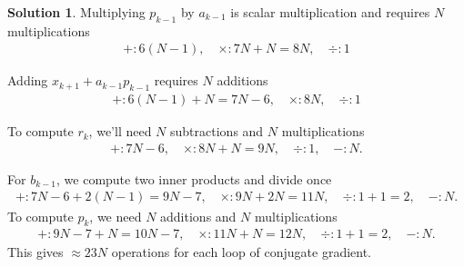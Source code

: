 \documentclass[12pt]{article}
\theoremstyle{definition}
\newtheorem{sol}{Solution}
\theoremstyle{remark}
\begin{document}
\begin{sol}
Multiplying $p_{k-1}$ by $a_{k-1}$ is scalar multiplication and requires $N$ multiplications 
\begin{align*}
    +: 6(N-1), \quad  \times: 7N + N = 8N, \quad \div: 1
\end{align*}

Adding $x_{k+1} + a_{k-1} p_{k-1}$ requires $N$ additions
\begin{align*}
    +: 6(N-1) + N = 7N - 6, \quad  \times: 8N, \quad \div: 1
\end{align*}

To compute $r_{k}$, we'll need $N$ subtractions and $N$ multiplications
\begin{align*}
+: 7N - 6, \quad  \times: 8N + N = 9N, \quad \div: 1, \quad -: N.
\end{align*}

For $b_{k-1}$, we compute two inner products and divide once
\begin{align*}
    +: 7N - 6  + 2(N-1) = 9N - 7, \quad  \times: 9N + 2N = 11N, \quad \div: 1 + 1 = 2, \quad -: N.
\end{align*}
To compute $p_{k}$, we need $N$ additions and $N$ multiplications
\begin{align*}
    +: 9N - 7 + N = 10N - 7, \quad  \times: 11N + N = 12N, \quad \div: 1 + 1 = 2, \quad -: N.
\end{align*}
This gives $\approx23N$ operations for each loop of conjugate gradient.


\end{sol}
\end{document}
